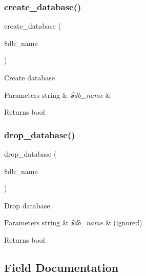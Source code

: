 \subsubsection{\texorpdfstring{create\+\_\+database()}{create\_database()}}
{\footnotesize\ttfamily create\+\_\+database (\begin{DoxyParamCaption}\item[{}]{\$db\+\_\+name }\end{DoxyParamCaption})}

Create database


\begin{DoxyParams}[1]{Parameters}
string & {\em \$db\+\_\+name} & \\
\hline
\end{DoxyParams}
\begin{DoxyReturn}{Returns}
bool 
\end{DoxyReturn}
\mbox{\label{class_c_i___d_b__ibase__forge_a9612987b2d4230de2638d15857e92e67}} 
\subsubsection{\texorpdfstring{drop\+\_\+database()}{drop\_database()}}
{\footnotesize\ttfamily drop\+\_\+database (\begin{DoxyParamCaption}\item[{}]{\$db\+\_\+name }\end{DoxyParamCaption})}

Drop database


\begin{DoxyParams}[1]{Parameters}
string & {\em \$db\+\_\+name} & (ignored) \\
\hline
\end{DoxyParams}
\begin{DoxyReturn}{Returns}
bool 
\end{DoxyReturn}


\subsection{Field Documentation}
\mbox{\label{class_c_i___d_b__ibase__forge_a2f6484fcb8d1dc3eef67a637227cd583}} 
